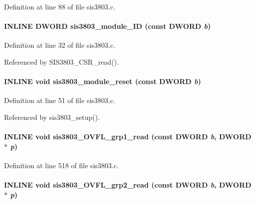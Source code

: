 Definition at line 88 of file sis3803.c.
\paragraph[{sis3803\_\-module\_\-ID}]{\setlength{\rightskip}{0pt plus 5cm}INLINE {\bf DWORD} sis3803\_\-module\_\-ID (const {\bf DWORD} {\em b})}\hfill\label{sis3803_8h_a89a7bfd6ecaee9a8885a5f8fd213567b}


Definition at line 32 of file sis3803.c.

Referenced by SIS3803\_\-CSR\_\-read().
\paragraph[{sis3803\_\-module\_\-reset}]{\setlength{\rightskip}{0pt plus 5cm}INLINE void sis3803\_\-module\_\-reset (const {\bf DWORD} {\em b})}\hfill\label{sis3803_8h_aa5e03da0f8c29e760dce254d68d9b5de}


Definition at line 51 of file sis3803.c.

Referenced by sis3803\_\-setup().
\paragraph[{sis3803\_\-OVFL\_\-grp1\_\-read}]{\setlength{\rightskip}{0pt plus 5cm}INLINE void sis3803\_\-OVFL\_\-grp1\_\-read (const {\bf DWORD} {\em b}, \/  {\bf DWORD} $\ast$ {\em p})}\hfill\label{sis3803_8h_a1e1d8589dd1581102de587daa4440d11}


Definition at line 518 of file sis3803.c.
\paragraph[{sis3803\_\-OVFL\_\-grp2\_\-read}]{\setlength{\rightskip}{0pt plus 5cm}INLINE void sis3803\_\-OVFL\_\-grp2\_\-read (const {\bf DWORD} {\em b}, \/  {\bf DWORD} $\ast$ {\em p})}\hfill\label{sis3803_8h_a81e724b951313e75a6fa5c9fb7854c30}


